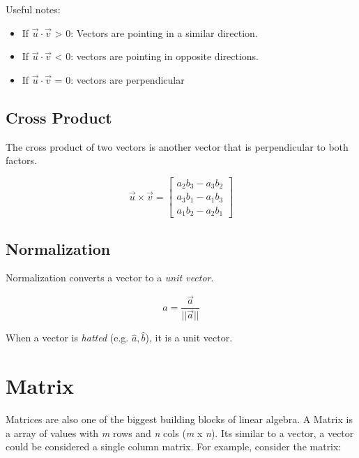 \documentclass[12pt]{report}
\begin{document}
            Useful notes:

            \begin{itemize}
                \item If $\vec{u} \cdot \vec{v}$ 
                    > 0: Vectors are pointing in a similar direction.
                \item If $\vec{u} \cdot \vec{v}$ 
                    < 0: vectors are pointing in opposite directions.
                \item If $\vec{u} \cdot \vec{v}$ 
                    = 0: vectors are perpendicular
            \end{itemize}

        \subsection{Cross Product}
            The cross product of two vectors is another vector that is perpendicular to both factors.

            \begin{equation}
                \vec{u} \times \vec{v} = \begin{bmatrix} a_2b_3 - a_3b_2 \\ a_3b_1 - a_1b_3 \\ a_1b_2 - a_2b_1 \end{bmatrix}
            \end{equation}

        \subsection{Normalization}
            Normalization converts a vector to a \emph{unit vector}.

            \begin{equation}
                \hat{a} = \frac{\vec{a}}{||\vec{a}||}
            \end{equation}

            When a vector is \emph{hatted} (e.g. $\hat{a}, \hat{b}$), it is a unit vector.

    \section{Matrix}
        Matrices are also one of the biggest building blocks of linear algebra. A Matrix is a array of values with \emph{m} rows and \emph{n} cols (\emph{m} x \emph{n}). Its similar to a vector, a vector could be considered a single column matrix. For example, consider the matrix:
\end{document}

